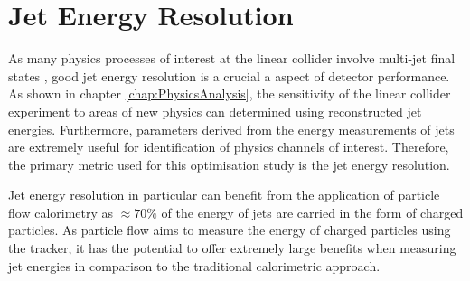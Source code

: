 
\section{Jet Energy Resolution}
\label{sec:optstudiesmetric}
As many physics processes of interest at the linear collider involve multi-jet final states \cite{Abramowicz:2016zbo}, good jet energy resolution is a crucial a aspect of detector performance.  As shown in chapter \ref{chap:PhysicsAnalysis}, the sensitivity of the linear collider experiment to areas of new physics can determined using reconstructed jet energies.  Furthermore, parameters derived from the energy measurements of jets are extremely useful for identification of physics channels of interest.  Therefore, the primary metric used for this optimisation study is the jet energy resolution.

Jet energy resolution in particular can benefit from the application of particle flow calorimetry as $\approx 70 \%$ of the energy of jets are carried in the form of charged particles.  As particle flow aims to measure the energy of charged particles using the tracker, it has the potential to offer extremely large benefits when measuring jet energies in comparison to the traditional calorimetric approach.  


